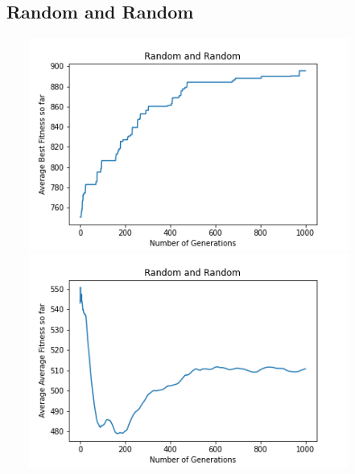 \documentclass[a4paper]{article}
\begin{document}
\subsection{Random and Random}
\includegraphics[width=12cm, height=7cm]{Graphs/KnapSack/rand_rand_bsf.png} \\
\includegraphics[width=12cm, height=7cm]{Graphs/KnapSack/rand_rand_avg.png} \\
\end{document}
